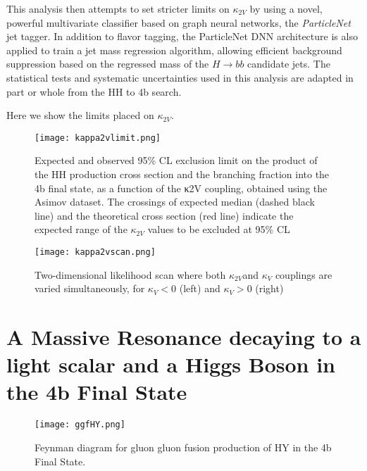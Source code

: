 This analysis then attempts to set stricter limits on $\kappa_{2V}$ by using a novel, powerful multivariate classifier based on graph neural networks, the \textit{ParticleNet} jet tagger.
In addition to flavor tagging, the ParticleNet DNN architecture is also applied to train a jet mass regression algorithm, allowing efficient background suppression based on the regressed mass of the $H \rightarrow bb$ candidate jets.
The statistical tests and systematic uncertainties used in this analysis are adapted in part or whole from the HH to 4b search.

Here we show the limits placed on $\kappa_{2V}$.
\begin{figure} %
    \centering
    \texttt{[image: kappa2vlimit.png]}
    \caption{Expected and observed 95\% CL exclusion limit on the product of the HH production cross section and the branching fraction into the 4b final state, as a function of the κ2V
    coupling, obtained using the Asimov dataset. The crossings of expected median (dashed black
    line) and the theoretical cross section (red line) indicate the expected range of the $\kappa_{2V}$ values to
    be excluded at 95\% CL}
    \label{fig:kappa2Vlimit}
 \end{figure}

 \begin{figure} %
    \centering
    \texttt{[image: kappa2vscan.png]}
    \caption{Two-dimensional likelihood scan where both $\kappa_{2V}$and $\kappa_{V}$ couplings are varied simultaneously, for $\kappa_{V} < 0$ (left) and $\kappa_{V} > 0$ (right)}
    \label{fig:kappa2Vscan}
 \end{figure}

\section{A Massive Resonance decaying to a light scalar and a Higgs Boson in the 4b Final State}

\begin{figure} %
    \centering
    \texttt{[image: ggfHY.png]}
    \caption{Feynman diagram for gluon gluon fusion production of HY in the 4b Final State.}
    \label{fig:hy4bfeynman}
 \end{figure}


